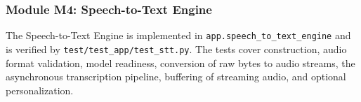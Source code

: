\documentclass[12pt, titlepage]{article}
\begin{document}



					
					
					


					

					
					
					



    



\subsubsection{Module M4: Speech-to-Text Engine}

The Speech-to-Text Engine is implemented in \texttt{app.speech\_to\_text\_engine} and is verified by \texttt{test/test\_app/test\_stt.py}. The tests cover construction, audio format validation, model readiness, conversion of raw bytes to audio streams, the asynchronous transcription pipeline, buffering of streaming audio, and optional personalization.
\end{document}
